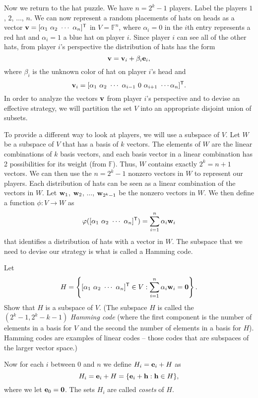 Now we return to the hat puzzle. We have $n = 2^k-1$ players. Label the players $1$, $2$, $\ldots$, $n$. We can now represent a random placements of hats on heads  as a vector $\vv = [\alpha_1 \ \alpha_2 \ \cdots \ \alpha_n]^{\tr}$
 in $V = \mathbb{F}^n$, where $\alpha_i = 0$ in the $i$th entry represents a red hat and  $\alpha_i =1$ a blue hat on player $i$. Since player $i$ can see all of the other hats, from player $i$'s perspective the distribution of hats has the form
 \[\mathbf{v} = \mathbf{v}_i+ \beta_i \mathbf{e}_i,\]
 where $\beta_i$ is the unknown color of hat on player $i$'s head and 
 \[\vv_i = [\alpha_1 \ \alpha_2 \ \cdots \ \alpha_{i-1} \ 0 \ \alpha_{i+1} \ \cdots \alpha_n]^{\tr}.\]
In order to analyze the vectors $\mathbf{v}$ from player $i$'s perspective and to devise an effective strategy, we will partition the set $V$ into an appropriate disjoint union of subsets.  
 
To provide a different way to look at players, we will use a subspace of $V$. Let $W$ be a subspace of $V$ that has a basis of $k$ vectors. The elements of $W$ are the linear combinations of $k$ basis vectors, and each basis vector in a linear combination has 2 possibilities for its weight (from $\mathbb{F}$). Thus, $W$ contains exactly $2^k = n+1$ vectors.  We can then use the $n=2^k-1$ nonzero vectors in $W$ to represent our players. Each distribution of hats can be seen as a linear combination of the vectors in $W$. Let $\mathbf{w}_1$, $\mathbf{w}_2$, $\ldots$, $\mathbf{w}_{2^k-1}$ be the nonzero vectors in $W$. We then define a function $\phi : V \to W$ as 
\[\phi([\alpha_1 \ \alpha_2 \ \cdots \ \alpha_n]^{\tr}) = \sum_{i=1}^{n} \alpha_i \vw_i\]
that identifies a distribution of hats with a vector in $W$. The subspace that we need to devise our strategy is what is called a Hamming code. 

\begin{pactivity} \label{act:hat_2}  Let 
\[H = \left\{[\alpha_1 \ \alpha_2 \ \cdots \ \alpha_n]^{\tr} \in V : \sum_{i=1}^{n} \alpha_i \vw_i = \vzero\right\}.\]
Show that $H$ is a subspace of $V$. (The subspace $H$ is called the $\left(2^k-1, 2^k-k-1\right)$ \emph{Hamming code} (where the first component is the number of elements in a basis for $V$ and the second the number of elements in a basis for $H$). Hamming codes are examples of linear codes -- those codes that are subspaces of the larger vector space.) 


\end{pactivity}




Now for each $i$ between 0 and $n$ we define $H_i = \mathbf{e}_i + H$ as 
\[H_i = \mathbf{e}_i + H = \{\mathbf{e}_i + \mathbf{h} : \mathbf{h} \in H\},\]
where we let $\mathbf{e}_0 = \mathbf{0}$. The sets $H_i$ are called \emph{cosets} of $H$. 

